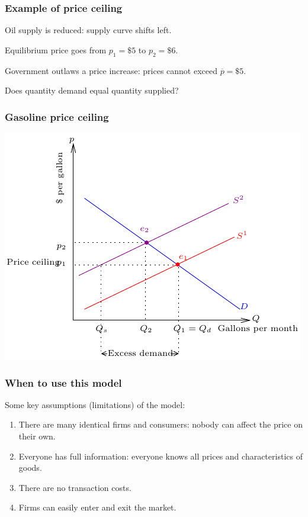 \documentclass[xcolor=pdftex,dvipsnames]{beamer}
\begin{document}
\begin{frame}
\frametitle{Example of price ceiling}

Oil supply is reduced: supply curve shifts left.

Equilibrium price goes from $p_1=\$5$ to $p_2=\$6$.

Government outlaws a price increase: prices cannot exceed $\overline
p=\$5$.

Does quantity demand equal quantity supplied?


\end{frame}
\begin{frame}
\frametitle{Gasoline price ceiling}
\begin{center}
\includegraphics{pics/GasCeiling}
\end{center}
\end{frame}

\begin{frame}
\frametitle{When to use this model}
Some key assumptions (limitations) of the model:
\begin{enumerate}[<+->]
\item There are many identical firms and consumers: nobody can affect
  the price on their own.
\item Everyone has full information: everyone knows all prices and
  characteristics of goods.
\item There are no transaction costs.
\item Firms can easily enter and exit the market.
\end{enumerate}

\end{frame}
\end{document}
